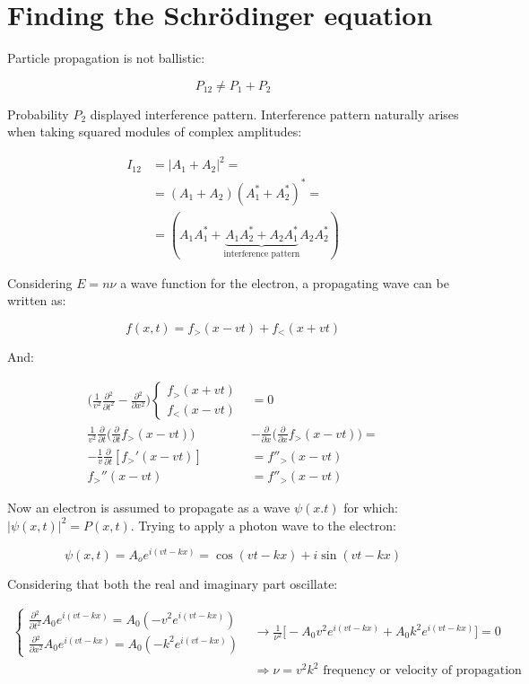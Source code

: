 \section{Finding the Schr\"odinger equation}
Particle propagation is not ballistic:

$$P_{12} \neq P_1 + P_2$$

Probability $P_2$ displayed interference pattern.
Interference pattern naturally arises when taking squared modules of complex amplitudes:

\begin{align*}
  I_{12} &= |A_1 + A_2|^2=\\
         &=(A_1 + A_2)(A_1^*+A_2^*)^*=\\
         &=(A_1A_1^*+\underbrace{A_1A_2^*+A_2A_1^*}_{\text{interference pattern}}A_2A_2^*)
\end{align*}

Considering $E=n\nu$ a wave function for the electron, a propagating wave can be written as:

$$f(x,t) = f_>(x-vt)+f_<(x+vt)$$

And:

\begin{align*}
  \biggl(\frac{1}{v^2}\frac{\partial {^2}}{\partial {t^2}}-\frac{\partial {^2}}{\partial {x^2}}\biggr)\begin{cases}f_>(x+vt)\\f_<(x-vt)\end{cases} &= 0\\
  \frac{1}{v^2}\frac{\partial {}}{\partial {t}}\biggl(\frac{\partial {}}{\partial {t}}f_>(x-vt)\biggr)&-\frac{\partial {}}{\partial {x}}\biggl(\frac{\partial {}}{\partial {x}}f_>(x-vt)\biggr)=\\
  -\frac{1}{v}\frac{\partial {}}{\partial {t}}[f_>'(x-vt)]&=f''_>(x-vt)\\
  f_>''(x-vt) &=f''_>(x-vt)
\end{align*}

Now an electron is assumed to propagate as a wave $\psi(x.t)$ for which: $|\psi(x,t)|^2 = P(x,t)$.
Trying to apply a photon wave to the electron:

$$\psi(x,t) = A_oe^{i(vt-kx)} = \cos(vt-kx) + i\sin(vt - kx)$$

Considering that both the real and imaginary part oscillate:

\begin{align*}
  \begin{cases}\frac{\partial {^2}}{\partial {t^2}}A_0e^{i(vt-kx)} = A_0(-v^2e^{i(vt-kx)})\\\frac{\partial {^2}}{\partial {x^2}}A_0e^{i(vt-kx)} = A_0(-k^2e^{i(vt-kx)})\end{cases}&\rightarrow \frac{1}{\nu^2}\biggl[-A_0v^2e^{i(vt-kx)}+A_0k^2e^{i(vt-kx)}\biggr] = 0\\
                                                                                                                                                                                  &\Rightarrow \nu = v^2k^2\text{ frequency or velocity of propagation}
\end{align*}


